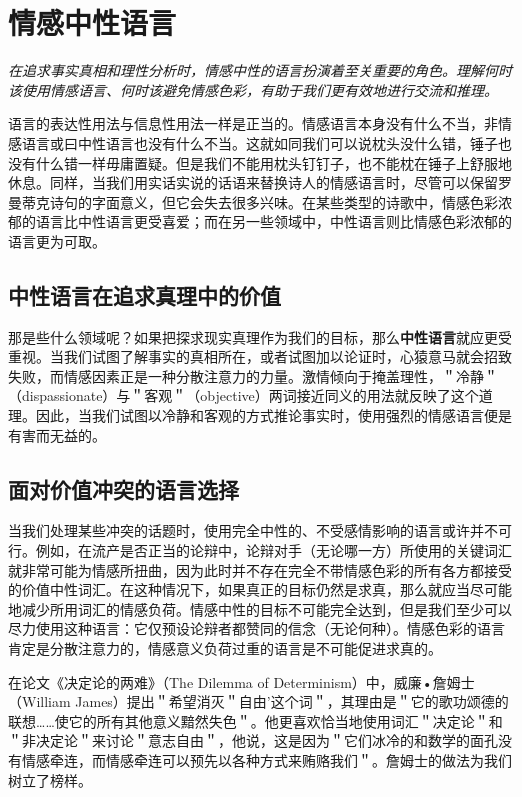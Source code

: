 \section{情感中性语言}

\begin{logicbox}[title=引言]
\textit{在追求事实真相和理性分析时，情感中性的语言扮演着至关重要的角色。理解何时该使用情感语言、何时该避免情感色彩，有助于我们更有效地进行交流和推理。}
\end{logicbox}

语言的表达性用法与信息性用法一样是正当的。情感语言本身没有什么不当，非情感语言或曰中性语言也没有什么不当。这就如同我们可以说枕头没什么错，锤子也没有什么错一样毋庸置疑。但是我们不能用枕头钉钉子，也不能枕在锤子上舒服地休息。同样，当我们用实话实说的话语来替换诗人的情感语言时，尽管可以保留罗曼蒂克诗句的字面意义，但它会失去很多兴味。在某些类型的诗歌中，情感色彩浓郁的语言比中性语言更受喜爱；而在另一些领域中，中性语言则比情感色彩浓郁的语言更为可取。

\subsection{中性语言在追求真理中的价值}

那是些什么领域呢？如果把探求现实真理作为我们的目标，那么\textbf{中性语言}就应更受重视。当我们试图了解事实的真相所在，或者试图加以论证时，心猿意马就会招致失败，而情感因素正是一种分散注意力的力量。激情倾向于掩盖理性，＂冷静＂（dispassionate）与＂客观＂（objective）两词接近同义的用法就反映了这个道理。因此，当我们试图以冷静和客观的方式推论事实时，使用强烈的情感语言便是有害而无益的。

\subsection{面对价值冲突的语言选择}

当我们处理某些冲突的话题时，使用完全中性的、不受感情影响的语言或许并不可行。例如，在流产是否正当的论辩中，论辩对手（无论哪一方）所使用的关键词汇就非常可能为情感所扭曲，因为此时并不存在完全不带情感色彩的所有各方都接受的价值中性词汇。在这种情况下，如果真正的目标仍然是求真，那么就应当尽可能地减少所用词汇的情感负荷。情感中性的目标不可能完全达到，但是我们至少可以尽力使用这种语言：它仅预设论辩者都赞同的信念（无论何种）。情感色彩的语言肯定是分散注意力的，情感意义负荷过重的语言是不可能促进求真的。

在论文《决定论的两难》（The Dilemma of Determinism）中，威廉•詹姆士（William James）提出＂希望消灭＂自由'这个词＂，其理由是＂它的歌功颂德的联想……使它的所有其他意义黯然失色＂。他更喜欢恰当地使用词汇＂决定论＂和＂非决定论＂来讨论＂意志自由＂，他说，这是因为＂它们冰冷的和数学的面孔没有情感牵连，而情感牵连可以预先以各种方式来贿赂我们＂。詹姆士的做法为我们树立了榜样。

